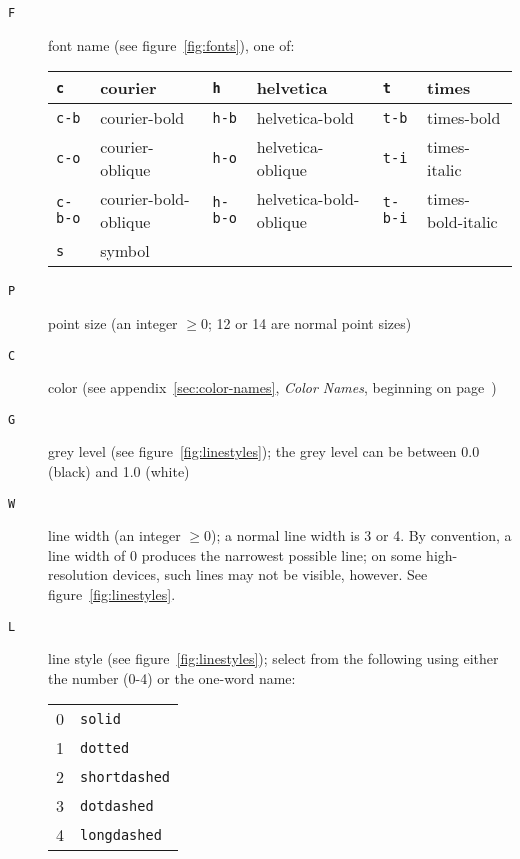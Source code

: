 \documentclass{book}
\begin{document}
\begin{description}
\item[{\tt F}]
%
font name (see figure~\ref{fig:fonts}), one of:
\begin{center}
\begin{tabular}{lp{2cm}|lp{2cm}|lp{2cm}}
{\tt c} & courier & {\tt h} & helvetica & {\tt t} & times \\
\hline
{\tt c-b} & courier-bold & {\tt h-b} & helvetica-bold & {\tt t-b} &
 times-bold \\
\hline
{\tt c-o} & courier-oblique & {\tt h-o} & helvetica-oblique & {\tt t-i} &
 times-italic \\
\hline
{\tt c-b-o} & courier-bold-oblique & {\tt h-b-o} & helvetica-bold-oblique &
 {\tt t-b-i} & times-bold-italic \\
\hline
{\tt s} & symbol
\end{tabular}
\end{center}

\item[{\tt P}]
%
%
%
point size (an integer $\ge 0$; 12 or 14 are normal point sizes)

\item[{\tt C}]
%
color (see appendix~\ref{sec:color-names}, {\em Color Names}, beginning
on page~\pageref{sec:color-names})

\item[{\tt G}]
%
grey level (see figure~\ref{fig:linestyles}); the grey level can be between
0.0 (black) and 1.0 (white)

\item[{\tt W}]
%
%
line width (an integer $\ge 0$);  a normal line width is 3 or 4.  By
convention, a line width of 0 produces the narrowest possible line;  on
some high-resolution devices, such lines may not be visible, however.  See
figure~\ref{fig:linestyles}.

\item[{\tt L}]
%
line style (see figure~\ref{fig:linestyles}); select from the following
using either the number (0-4) or the one-word name:

\begin{center}
\begin{tabular}{ll}
0 & {\tt solid} \\
1 & {\tt dotted} \\
2 & {\tt shortdashed} \\
3 & {\tt dotdashed} \\
4 & {\tt longdashed}
\end{tabular}
\end{center}
\end{description}
\end{document}
